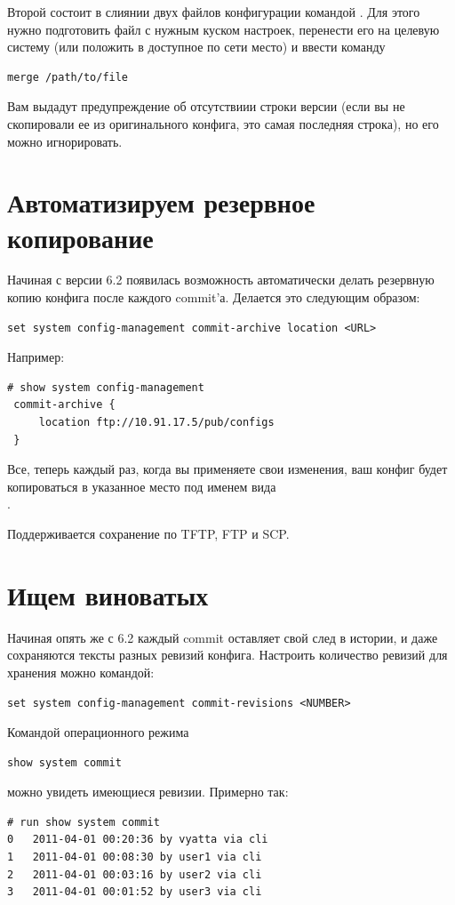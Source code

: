 \documentclass[a4paper,12pt, twoside, russian]{report}
\begin{document}
Второй состоит в слиянии двух файлов конфигурации командой . Для этого нужно подготовить файл с нужным
куском настроек, перенести его на целевую систему (или положить в доступное по сети место) и ввести команду
\begin{verbatim}merge /path/to/file\end{verbatim} Вам выдадут предупреждение об отсутствиии строки версии
(если вы не скопировали ее из оригинального конфига, это самая последняя строка), но его можно игнорировать.

\section{Автоматизируем резервное копирование}

Начиная с версии 6.2 появилась возможность автоматически делать резервную копию конфига после каждого commit’а.
Делается это следующим образом: 
\begin{verbatim}set system config-management commit-archive location <URL>\end{verbatim} Например:
\begin{verbatim}
# show system config-management
 commit-archive {
     location ftp://10.91.17.5/pub/configs
 }
\end{verbatim}
Все, теперь каждый раз, когда вы применяете свои изменения, ваш конфиг будет копироваться в указанное
место под именем вида \\ .

Поддерживается сохранение по TFTP, FTP и SCP.

\section{Ищем виноватых}

Начиная опять же с 6.2 каждый commit оставляет свой след в истории, и даже сохраняются тексты разных ревизий 
конфига. Настроить количество ревизий для хранения можно командой:
\begin{verbatim}set system config-management commit-revisions <NUMBER>\end{verbatim}

Командой операционного режима \begin{verbatim}show system commit\end{verbatim}
можно увидеть имеющиеся ревизии. Примерно так:
\begin{verbatim}
# run show system commit
0   2011-04-01 00:20:36 by vyatta via cli
1   2011-04-01 00:08:30 by user1 via cli
2   2011-04-01 00:03:16 by user2 via cli
3   2011-04-01 00:01:52 by user3 via cli
\end{verbatim}
\end{document}
